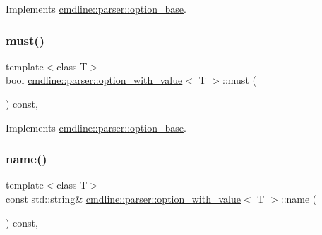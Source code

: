Implements \mbox{\hyperlink{classcmdline_1_1parser_1_1option__base_a6617c8ff8b2864e8cf3182ca76f7e7ac}{cmdline\+::parser\+::option\+\_\+base}}.

\mbox{\label{classcmdline_1_1parser_1_1option__with__value_a3dd668a7784eaa1fdeac77367c81f489}} 
\subsubsection{\texorpdfstring{must()}{must()}}
{\footnotesize\ttfamily template$<$class T$>$ \\
bool \mbox{\hyperlink{classcmdline_1_1parser_1_1option__with__value}{cmdline\+::parser\+::option\+\_\+with\+\_\+value}}$<$ T $>$\+::must (\begin{DoxyParamCaption}{ }\end{DoxyParamCaption}) const\hspace{0.3cm}{\ttfamily [inline]}, {\ttfamily [virtual]}}



Implements \mbox{\hyperlink{classcmdline_1_1parser_1_1option__base_aa12b58243643ca229983f5dcd5b0b82e}{cmdline\+::parser\+::option\+\_\+base}}.

\mbox{\label{classcmdline_1_1parser_1_1option__with__value_a37a101909b8d912d9cab296be19328da}} 
\subsubsection{\texorpdfstring{name()}{name()}}
{\footnotesize\ttfamily template$<$class T$>$ \\
const std\+::string\& \mbox{\hyperlink{classcmdline_1_1parser_1_1option__with__value}{cmdline\+::parser\+::option\+\_\+with\+\_\+value}}$<$ T $>$\+::name (\begin{DoxyParamCaption}{ }\end{DoxyParamCaption}) const\hspace{0.3cm}{\ttfamily [inline]}, {\ttfamily [virtual]}}




